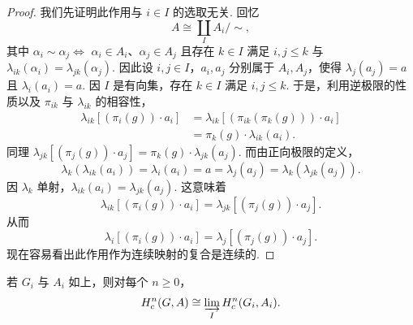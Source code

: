 \begin{proof}
我们先证明此作用与 $i\in I$ 的选取无关. 回忆
\[
A\cong\coprod_I A_i/\!\sim,
\]
其中 $\alpha_i\sim\alpha_j\Leftrightarrow$ $\alpha_i\in A_i$、$\alpha_j\in A_j$ 且存在 $k\in I$ 满足 $i,j\leq k$ 与 $\lambda_{ik}(\alpha_i)=\lambda_{jk}(\alpha_j)$. 因此设 $i,j\in I$，$a_i,a_j$ 分别属于 $A_i,A_j$，使得 $\lambda_j(a_j)=a$ 且 $\lambda_i(a_i)=a$. 因 $I$ 是有向集，存在 $k\in I$ 满足 $i,j\leq k$. 于是，利用逆极限的性质以及 $\pi_{ik}$ 与 $\lambda_{ik}$ 的相容性，
\[
\begin{aligned}
\lambda_{ik}[(\pi_i(g))\cdot a_i]&=\lambda_{ik}[(\pi_{ik}(\pi_k(g)))\cdot a_i]\\
&=\pi_k(g)\cdot\lambda_{ik}(a_i).
\end{aligned}
\]
同理 $\lambda_{jk}[(\pi_j(g))\cdot a_j]=\pi_k(g)\cdot\lambda_{jk}(a_j)$. 而由正向极限的定义，
\[
\lambda_k(\lambda_{ik}(a_i))=\lambda_i(a_i)=a=\lambda_j(a_j)=\lambda_k(\lambda_{jk}(a_j)).
\]
因 $\lambda_k$ 单射，$\lambda_{ik}(a_i)=\lambda_{jk}(a_j)$. 这意味着
\[
\lambda_{ik}[(\pi_i(g))\cdot a_i]=\lambda_{jk}[(\pi_j(g))\cdot a_j].
\]
从而
\[
\lambda_i[(\pi_i(g))\cdot a_i]=\lambda_j[(\pi_j(g))\cdot a_j].
\]
现在容易看出此作用作为连续映射的复合是连续的.
\end{proof}

\begin{theorem}\label{c5-thm-3-6}
若 $G_i$ 与 $A_i$ 如上，则对每个 $n\geq 0$，
\[
H^n_c(G,A)\cong\varinjlim_I H^n_c(G_i,A_i).
\]
\end{theorem}

